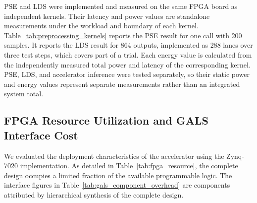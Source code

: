 ﻿\documentclass[12pt]{article}
\begin{document}
PSE and LDS were implemented and measured on the same FPGA board as independent kernels. Their latency and power values are standalone measurements under the workload and boundary of each kernel. Table~\ref{tab:preprocessing_kernels} reports the PSE result for one call with 200 samples. It reports the LDS result for 864 outputs, implemented as 288 lanes over three test steps, which covers part of a trial. Each energy value is calculated from the independently measured total power and latency of the corresponding kernel. PSE, LDS, and accelerator inference were tested separately, so their static power and energy values represent separate measurements rather than an integrated system total.

\begin{table}[!htbp]
\centering
\caption{Standalone FPGA measurements of preprocessing kernels at board level. PSE, LDS, and the GALS accelerator were tested independently, and each power and energy value retains its own measurement boundary. Power components were rounded independently.}
\label{tab:preprocessing_kernels}
\scriptsize
\renewcommand{\arraystretch}{1.15}
\setlength{\tabcolsep}{2.3pt}
\end{table}

\subsection{FPGA Resource Utilization and GALS Interface Cost}

We evaluated the deployment characteristics of the accelerator using the Zynq-7020 implementation. As detailed in Table~\ref{tab:fpga_resource}, the complete design occupies a limited fraction of the available programmable logic. The interface figures in Table~\ref{tab:gals_component_overhead} are components attributed by hierarchical synthesis of the complete design.
\end{document}
